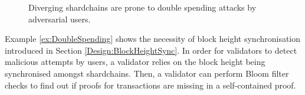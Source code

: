 \begin{example}
\begin{figure}[hbt]
\begin{tikzpicture}
  \end{tikzpicture}
  \caption{Diverging shardchains are prone to double spending attacks by adversarial users.\label{fig:Eval:Attacks}}
\end{figure}
\end{example}

Example \ref{ex:DoubleSpending} shows the necessity of block height synchronisation introduced in Section \ref{Design:BlockHeightSync}. In order for validators to detect malicious attempts by users, a validator relies on the block height being synchronised amongst shardchains. Then, a validator can perform Bloom filter checks to find out if proofs for transactions are missing in a self-contained proof.
